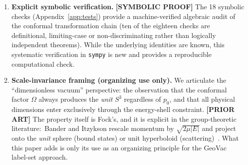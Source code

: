 \documentclass[aps,pra,twocolumn,superscriptaddress,longbibliography]{revtex4-2}
\begin{document}
\begin{enumerate}
the neighbours $28, 29$ are $4$--$7\times$ larger;\ a proxy, not a spectral gap:\ the $\ell$-blocks are disconnected and the mode selection is a near-tie --- Paper~1 \S III conditioning caveat). The $\lambda_{\max}$ mode lives in a mid-$l$ block with negligible weight on the $1s$ node (the $l = 0$ block alone saturates only $\lambda_{\max} \to 4$), and $8 = 2 d_{\max}$ is the band edge of any large two-dimensional grid, carrying no $S^3$ information (the constant $C_{\mathrm{sat}}$ is a Dirichlet band edge); the spectrum of $\kappa L$ is confined to $[-1/2, 0]$, so no level-by-level Rydberg ladder is reproduced. The operator convergence $L \to \Delta_{S^3}$ is therefore not merely unestablished but false.

\item \textbf{Explicit symbolic verification.} \textbf{[SYMBOLIC PROOF]} The 18 symbolic checks (Appendix~\ref{app:tests}) provide a machine-verified algebraic audit of the conformal transformation chain (ten of the eighteen checks are definitional, limiting-case or non-discriminating rather than logically independent theorems). While the underlying identities are known, this systematic verification in \texttt{sympy} is new and provides a reproducible computational check.

\item \textbf{Scale-invariance framing (organizing use only).} We articulate the ``dimensionless vacuum'' perspective: the observation that the conformal factor $\Omega$ always produces the \textit{unit} $S^3$ regardless of $p_0$, and that all physical dimensions enter exclusively through the energy-shell constraint. \textbf{[PRIOR ART]} The property itself is Fock's, and it is explicit in the group-theoretic literature:\ Bander and Itzykson rescale momentum by $\sqrt{2\mu|E|}$ and project onto the \emph{unit} sphere (bound states) or unit hyperboloid (scattering)~\cite{bander1966,bander1966b}.  What this paper adds is only its use as an organizing principle for the GeoVac label-set approach.


\end{enumerate}
\end{document}
